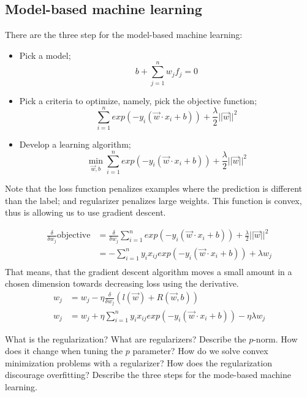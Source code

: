 \subsection{Model-based machine learning}
There are the three step for the model-based machine learning:
\begin{itemize}
    \item Pick a model;
    \begin{equation}
        b + \sum_{j=1}^n w_jf_j = 0
    \end{equation}
    \item Pick a criteria to optimize, namely, pick the objective function;
    \begin{equation}
        \sum_{i=1}^n exp(-y_i(\vec{w} \cdot x_i + b)) + \frac \lambda 2 ||\vec{w}||^2
    \end{equation}
    \item Develop a learning algorithm;
    \begin{equation}
        \min_{\vec{w},b} \sum_{i=1}^n exp(-y_i(\vec{w} \cdot x_i + b)) + \frac \lambda 2 ||\vec{w}||^2
    \end{equation}
\end{itemize}
Note that the loss function penalizes examples where the prediction is different than the label; and regularizer penalizes large weights. This function is convex, thus is allowing us to use gradient descent.

\begin{align}
    \frac \delta {\delta w_j} \text{objective} &= \frac \delta {\delta w_j} \sum_{i=1}^n exp(-y_i(\vec{w} \cdot x_i + b))+ \frac \lambda 2 ||\vec{w}||^2\\
    &= -\sum_{i=1}^n y_i x_{ij} exp(-y_i(\vec{w} \cdot x_i + b)) + \lambda w_j\\
\end{align}
That means, that the gradient descent algorithm moves a small amount in a chosen dimension towards decreasing loss using the derivative.
\begin{align}
    w_j &= w_j - \eta \frac \delta {\delta w_j} (l(\vec{w}) + R(\vec{w},b))\\
    w_j &= w_j + \eta \sum_{i=1}^n y_i x_{ij} exp(-y_i(\vec{w} \cdot x_i + b)) - \eta \lambda w_j
\end{align}

\newpage
\begin{exercise}[topsep=20pt, itemsep=10pt]
    \ex What is the regularization? What are regularizers?
    \ex Describe the \(p\)-norm. How does it change when tuning the \(p\) parameter?
    \ex How do we solve convex minimization problems with a regularizer?
    \ex[!] How does the regularization discourage overfitting?
    \ex Describe the three steps for the mode-based machine learning.
\end{exercise}
